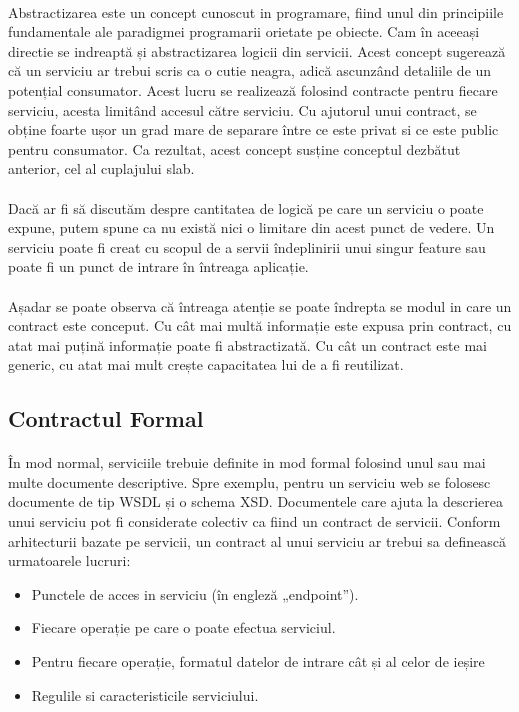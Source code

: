 \documentclass[12pt]{report}
\begin{document}
  	\paragraph{}Abstractizarea este un concept cunoscut in programare, fiind unul din principiile fundamentale ale paradigmei programarii orietate pe obiecte. Cam în aceeași directie se indreaptă și abstractizarea logicii din servicii. Acest concept sugerează că un serviciu ar trebui scris ca o cutie neagra, adică ascunzând detaliile de un potențial consumator. Acest lucru se realizează folosind contracte pentru fiecare serviciu, acesta limitând accesul către serviciu. Cu ajutorul unui contract, se obține foarte ușor un grad mare de separare între ce este privat si ce este public pentru consumator. Ca rezultat, acest concept susține conceptul dezbătut anterior, cel al cuplajului slab.\cite{erl2}
  	\paragraph{}Dacă ar fi să discutăm despre cantitatea de logică pe care un serviciu o poate expune, putem spune ca nu există nici o limitare din acest punct de vedere. Un serviciu poate fi creat cu scopul de a servii îndeplinirii unui singur feature sau poate fi un punct de intrare în întreaga aplicație.
  	\paragraph{}Așadar se poate observa că întreaga atenție se poate îndrepta se modul in care un contract este conceput. Cu cât mai multă informație este expusa prin contract, cu atat mai puțină informație poate fi abstractizată. Cu cât un contract este mai generic, cu atat mai mult crește capacitatea lui de a fi reutilizat.
  	\subsection{Contractul Formal}
  	\paragraph{}În mod normal, serviciile trebuie definite in mod formal folosind unul sau mai multe documente descriptive. Spre exemplu, pentru un serviciu web se folosesc documente de tip WSDL și o schema XSD. Documentele care ajuta la descrierea unui serviciu pot fi considerate colectiv ca fiind un contract de servicii. Conform arhitecturii bazate pe servicii, un contract al unui serviciu ar trebui sa definească urmatoarele lucruri:
  	\begin{itemize}
  	\item Punctele de acces in serviciu (în engleză „endpoint”).
  	\item Fiecare operație pe care o poate efectua serviciul.
  	\item Pentru fiecare operație, formatul datelor de intrare cât și al celor de ieșire
  	\item Regulile si caracteristicile serviciului.
  	\end{itemize}
\end{document}
